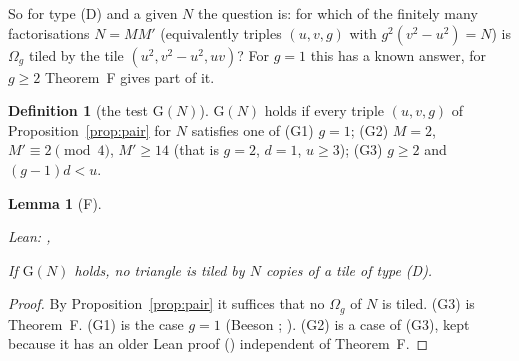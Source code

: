 \documentclass[11pt,reqno]{amsart}
\theoremstyle{plain}
\newtheorem{lemma}[theorem]{Lemma}
\theoremstyle{definition}
\newtheorem{definition}[theorem]{Definition}
\newcommand{\sF}{\textup{\textsf{F}}}
\begin{document}
So for type (D) and a given $N$ the question is: for which of the finitely many factorisations $N=MM'$ (equivalently triples $(u,v,g)$ with $g^2(v^2-u^2)=N$) is $\Omega_{g}$ tiled by the tile $(u^2,v^2-u^2,uv)$? For $g=1$ this has a known answer, for $g\ge2$ Theorem~F gives part of it.
\begin{definition}[the test $\mathrm G(N)$]\label{def:Gtest}
$\mathrm G(N)$ holds if every triple $(u,v,g)$ of Proposition~\ref{prop:pair} for $N$ satisfies one of
\textup{(G1)} $g=1$;
\textup{(G2)} $M=2$, $M'\equiv2\pmod4$, $M'\ge14$ (that is $g=2$, $d=1$, $u\ge3$);
\textup{(G3)} $g\ge2$ and $(g-1)d<u$.
\end{definition}
\begin{lemma}[\sF]\label{lem:Gleaf}
{\small\noindent\emph{Lean:} , \par}
If $\mathrm G(N)$ holds, no triangle is tiled by $N$ copies of a tile of type (D).
\end{lemma}
\begin{proof}
By Proposition~\ref{prop:pair} it suffices that no $\Omega_{g}$ of $N$ is tiled. (G3) is Theorem~F. (G1) is the case $g=1$ (Beeson \cite[Thm.~11.7]{BeesonIso}; ). (G2) is a case of (G3), kept because it has an older Lean proof () independent of Theorem~F.
\end{proof}
\end{document}
